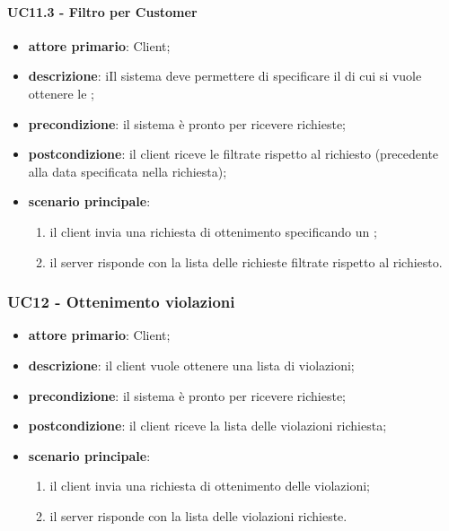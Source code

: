 \paragraph{UC11.3 - Filtro per Customer}
\begin{itemize}
	\item \textbf{attore primario}: Client;
	\item \textbf{descrizione}: iIl sistema deve permettere di specificare il  di cui si vuole ottenere le ;
	\item \textbf{precondizione}:  il sistema è pronto per ricevere richieste;
	\item \textbf{postcondizione}: il client riceve le  filtrate rispetto al  richiesto (precedente alla data specificata nella richiesta);
	\item \textbf{scenario principale}: 
	\begin{enumerate}
		\item  il client invia una richiesta di ottenimento  specificando un ; 
		\item  il server risponde con la lista delle  richieste filtrate rispetto al  richiesto.
	\end{enumerate}
\end{itemize}

\subsubsection{UC12 - Ottenimento violazioni}
\begin{itemize}
	\item \textbf{attore primario}: Client;
	\item \textbf{descrizione}: il client vuole ottenere una lista di violazioni;
	\item \textbf{precondizione}:  il sistema è pronto per ricevere richieste;
	\item \textbf{postcondizione}: il client riceve la lista delle violazioni richiesta;
	\item \textbf{scenario principale}: 
	\begin{enumerate}
		\item il client invia una richiesta di ottenimento delle violazioni;
		\item il server risponde con la lista delle violazioni richieste.
	\end{enumerate}
\end{itemize}

